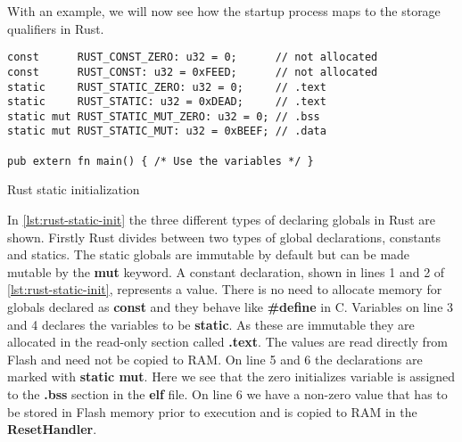 With an example, we will now see how the startup process maps to the storage qualifiers in Rust.
\begin{listing}[H]
\begin{verbatim}
const      RUST_CONST_ZERO: u32 = 0;      // not allocated
const      RUST_CONST: u32 = 0xFEED;      // not allocated
static     RUST_STATIC_ZERO: u32 = 0;     // .text
static     RUST_STATIC: u32 = 0xDEAD;     // .text
static mut RUST_STATIC_MUT_ZERO: u32 = 0; // .bss
static mut RUST_STATIC_MUT: u32 = 0xBEEF; // .data

pub extern fn main() { /* Use the variables */ }
\end{verbatim}
\caption{Rust static initialization}
\label{lst:rust-static-init}
\end{listing}
In \autoref{lst:rust-static-init} the three different types of declaring globals in Rust are shown.
Firstly Rust divides between two types of global declarations, constants and statics.
The static globals are immutable by default but can be made mutable by the \textbf{mut} keyword.
A constant declaration, shown in lines 1 and 2 of \autoref{lst:rust-static-init}, represents a value.
There is no need to allocate memory for globals declared as \textbf{const} and they behave like \textbf{\#define} in C. 
Variables on line 3 and 4 declares the variables to be \textbf{static}.
As these are immutable they are allocated in the read-only section called \textbf{.text}.
The values are read directly from Flash and need not be copied to RAM.
On line 5 and 6 the declarations are marked with \textbf{static mut}.
Here we see that the zero initializes variable is assigned to the \textbf{.bss} section in the \textbf{elf} file.
On line 6 we have a non-zero value that has to be stored in Flash memory prior to execution and is copied to RAM in the \textbf{ResetHandler}.

